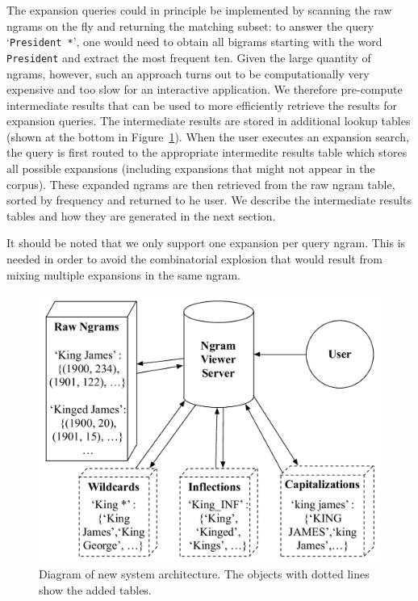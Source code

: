 \documentclass[11pt]{article}
\newcommand{\query}[1]{\texttt{#1}}
\begin{document}
The expansion queries could in principle be implemented by scanning the raw ngrams on the fly and returning the matching subset: to answer the query `\query{President *}', one would need to obtain all bigrams starting with the word \query{President} and extract the most frequent ten. Given the large quantity of ngrams, however, such an approach turns out to be computationally very expensive and too slow for an interactive application. We therefore pre-compute intermediate results that can be used to more efficiently retrieve the results for expansion queries. The intermediate results are stored in additional lookup tables (shown at the bottom in Figure~\ref{fig:architecture}). When the user executes an expansion search, the query is first routed to the appropriate intermedite results table which stores all possible expansions (including expansions that might not appear in the corpus).  These expanded ngrams are then retrieved from the raw ngram table, sorted by frequency and returned to he user.
We describe the intermediate results tables and how they are generated in the next section.

It should be noted that we only support one expansion per query ngram. This is needed in order to avoid the combinatorial explosion that would result from mixing multiple expansions in the same ngram.

\begin{figure}
\includegraphics[width=\columnwidth,keepaspectratio=true]{system_architecture}
\caption{\label{fig:architecture}Diagram of new system architecture. The objects with dotted lines show the added tables.}
\end{figure}
\end{document}
